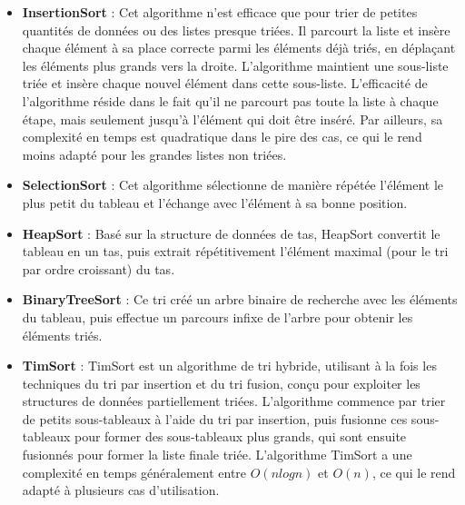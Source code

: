 \documentclass[a4paper,12pt]{article}
\begin{document}
\begin{itemize}
\item \textbf{InsertionSort} : Cet algorithme n’est efficace que pour trier de petites quantités de données ou des listes presque triées. Il parcourt la liste et insère chaque élément à sa place correcte parmi les éléments déjà triés, en déplaçant les éléments plus grands vers la droite. L'algorithme maintient une sous-liste triée et insère chaque nouvel élément dans cette sous-liste. L'efficacité de l'algorithme réside dans le fait qu'il ne parcourt pas toute la liste à chaque étape, mais seulement jusqu'à l'élément qui doit être inséré. Par ailleurs, sa complexité en temps est quadratique dans le pire des cas, ce qui le rend moins adapté pour les grandes listes non triées.\\

\item \textbf{SelectionSort} : Cet algorithme sélectionne de manière répétée l'élément le plus petit du tableau et l'échange avec l'élément à sa bonne position.\\

\item \textbf{HeapSort} : Basé sur la structure de données de tas, HeapSort convertit le tableau en un tas, puis extrait répétitivement l'élément maximal (pour le tri par ordre croissant) du tas.\\

\item \textbf{BinaryTreeSort} : Ce tri créé un arbre binaire de recherche avec les éléments du tableau, puis effectue un parcours infixe de l'arbre pour obtenir les éléments triés.\\

\item \textbf{TimSort} : TimSort est un algorithme de tri hybride, utilisant à la fois les techniques du tri par insertion et du tri fusion, conçu pour exploiter les structures de données partiellement triées. L'algorithme commence par trier de petits sous-tableaux à l'aide du tri par insertion, puis fusionne ces sous-tableaux pour former des sous-tableaux plus grands, qui sont ensuite fusionnés pour former la liste finale triée. L'algorithme TimSort a une complexité en temps généralement entre $O(n log n)$ et $O(n)$, ce qui le rend adapté à plusieurs cas d'utilisation.\\


\end{itemize}
\end{document}
